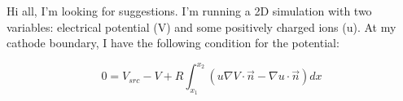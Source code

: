 \documentclass[12pt]{article}
\begin{document}
\begin{comment}
  \begin{align}
    \Gamma_e &= -n_e(\mu_e\cdot\vec{E}-D_e\cdot\nabla n_e) \\
    \Gamma_{\epsilon} &= -n_{\epsilon}(\mu_{\epsilon}\cdot\vec{E}-D_{\epsilon}\cdot\nabla n_{\epsilon}) \\
    n_{\epsilon} &= \frac{3}{2}n_eT_e \\
    \vec{E} &= -\nabla V \\
  \end{align}

  Example of a reaction in R$_{e,i,\epsilon}$:

  \begin{align}
    R_1 &= k_1n_en_{i} \\
    k_1 &= c_1T_e^{0.5}exp(-E_a/T_e)
  \end{align}

DGFunctionDiffusionDirichletBC

\begin{equation}
  { \nabla u \cdot n_e} [v] + \epsilon { \nabla v \cdot n_e } [u] + (\frac{\sigma}{|e|} \cdot [u][v])
\end{equation}

DGDiffusion

\begin{equation*}
\begin{multlined}
{\nabla u * n_e} [v] + \epsilon { \nabla v * n_e } [u] + (\sigma / |e| * [u][v]) \\
[a] = [ a_1 - a_2 ] \\
{a} = 0.5 * (a_1 + a_2)
\end{multlined}
\end{equation*}

\begin{gather*}
\int \vec{\Gamma}\cdot\vec{n}\,ds\\
\int \vec{\Gamma}\cdot\vec{n}\,2\pi r\,ds
\end{gather*}
\end{comment}

Hi all, I'm looking for suggestions. I'm running a 2D simulation with two variables: electrical potential (V) and some positively charged ions (u). At my cathode boundary, I have the following condition for the potential:

\begin{equation}
0 = V_{src} - V + R \int_{x_1}^{x_2}\left(u\nabla V\cdot\vec{n} - \nabla u\cdot\vec{n}\right)dx
\end{equation}
\end{document}
